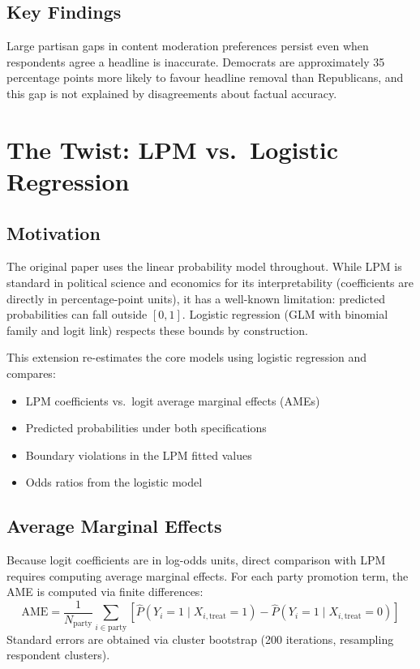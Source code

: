 \documentclass[12pt, a4paper]{article}
\renewcommand\_{\textunderscore\hspace{0pt}}
\begin{document}
\subsection{Key Findings}
Large partisan gaps in content moderation preferences persist even when respondents agree a headline is inaccurate. Democrats are approximately 35 percentage points more likely to favour headline removal than Republicans, and this gap is not explained by disagreements about factual accuracy.

\section{The Twist: LPM vs.\ Logistic Regression}

\subsection{Motivation}
The original paper uses the linear probability model throughout. While LPM is standard in political science and economics for its interpretability (coefficients are directly in percentage-point units), it has a well-known limitation: predicted probabilities can fall outside $[0, 1]$. Logistic regression (GLM with binomial family and logit link) respects these bounds by construction.

This extension re-estimates the core models using logistic regression and compares:
\begin{itemize}[nosep]
  \item LPM coefficients vs.\ logit average marginal effects (AMEs)
  \item Predicted probabilities under both specifications
  \item Boundary violations in the LPM fitted values
  \item Odds ratios from the logistic model
\end{itemize}

\subsection{Average Marginal Effects}
Because logit coefficients are in log-odds units, direct comparison with LPM requires computing average marginal effects. For each party promotion term, the AME is computed via finite differences:
\[
\text{AME} = \frac{1}{N_{\text{party}}} \sum_{i \in \text{party}} \left[\hat{P}(Y_i = 1 \mid X_{i,\text{treat}}=1) - \hat{P}(Y_i = 1 \mid X_{i,\text{treat}}=0)\right]
\]
Standard errors are obtained via cluster bootstrap (200 iterations, resampling respondent clusters).
\end{document}
